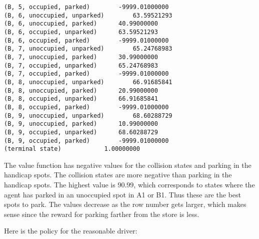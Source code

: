 \documentclass[paper=a4, fontsize=11pt]{scrartcl}
\begin{document}
\begin{verbatim}
(B, 5, occupied, parked)		-9999.01000000
(B, 6, unoccupied, unparked)		63.59521293
(B, 6, unoccupied, parked)		40.99000000
(B, 6, occupied, unparked)		63.59521293
(B, 6, occupied, parked)		-9999.01000000
(B, 7, unoccupied, unparked)		65.24768983
(B, 7, unoccupied, parked)		30.99000000
(B, 7, occupied, unparked)		65.24768983
(B, 7, occupied, parked)		-9999.01000000
(B, 8, unoccupied, unparked)		66.91685841
(B, 8, unoccupied, parked)		20.99000000
(B, 8, occupied, unparked)		66.91685841
(B, 8, occupied, parked)		-9999.01000000
(B, 9, unoccupied, unparked)		68.60288729
(B, 9, unoccupied, parked)		10.99000000
(B, 9, occupied, unparked)		68.60288729
(B, 9, occupied, parked)		-9999.01000000
(terminal state)			1.00000000
\end{verbatim}

The value function has negative values for the collision states and parking in the handicap spots. The collision states are more negative than parking in the handicap spots. The highest value is $90.99$, which corresponds to states where the agent has parked in an unoccupied spot in A1 or B1. Thus these are the best spots to park. The values decrease as the row number gets larger, which makes sense since the reward for parking farther from the store is less.

Here is the policy for the reasonable driver:
\end{document}
